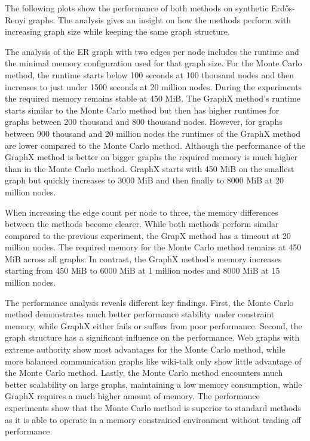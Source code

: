 The following plots show the performance of both methods on synthetic Erdős-Renyi graphs. The analysis gives an insight on how the methods perform with increasing graph size while keeping the same graph structure.\par
The analysis of the ER graph with two edges per node includes the runtime and the minimal memory configuration used for that graph size. For the Monte Carlo method, the runtime starts below 100 seconds at 100 thousand nodes and then increases to just under 1500 seconds at 20 million nodes. During the experiments the required memory remains stable at 450 MiB. The GraphX method's runtime starts similar to the Monte Carlo method but then has higher runtimes for graphs between 200 thousand and 800 thousand nodes. However, for graphs between 900 thousand and 20 million nodes the runtimes of the GraphX method are lower compared to the Monte Carlo method. Although the performance of the GraphX method is better on bigger graphs the required memory is much higher than in the Monte Carlo method. GraphX starts with 450 MiB on the smallest graph but quickly increases to 3000 MiB and then finally to 8000 MiB at 20 million nodes.\par
When increasing the edge count per node to three, the memory differences between the methods become clearer. While both methods perform similar compared to the previous experiment, the GrapX method has a timeout at 20 million nodes. The required memory for the Monte Carlo method remains at 450 MiB across all graphs. In contrast, the GraphX method's memory increases starting from 450 MiB to 6000 MiB at 1 million nodes and 8000 MiB at 15 million nodes.\par
The performance analysis reveals different key findings. First, the Monte Carlo method demonstrates much better performance stability under constraint memory, while GraphX either fails or suffers from poor performance. Second, the graph structure has a significant influence on the performance. Web graphs with extreme authority show most advantages for the Monte Carlo method, while more balanced communication graphs like wiki-talk only show little advantage of the Monte Carlo method. Lastly, the Monte Carlo method encounters much better scalability on large graphs, maintaining a low memory consumption, while GraphX requires a much higher amount of memory. The performance experiments show that the Monte Carlo method is superior to standard methods as it is able to operate in a memory constrained environment without trading off performance.


